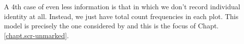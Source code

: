 A 4th case of even less information is that in which 
we don't record individual identity at all. Instead, 
we just have total count frequencies in each plot.
This model is precisely the one considered by
\citep{chandler_royle:2012} and this is the focus of
Chapt. \ref{chapt.scr-unmarked}.

